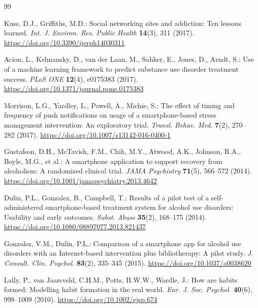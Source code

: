 \documentclass[a4paper]{article}
\begin{document}
\begin{thebibliography}{99}

 Kuss, D.J., Griffiths, M.D.: Social networking sites and addiction: Ten lessons learned. \textit{Int. J. Environ. Res. Public Health} \textbf{14}(3), 311 (2017). \url{https://doi.org/10.3390/ijerph14030311}

 Acion, L., Kelmansky, D., van der Laan, M., Sahker, E., Jones, D., Arndt, S.: Use of a machine learning framework to predict substance use disorder treatment success. \textit{PLoS ONE} \textbf{12}(4), e0175383 (2017). \url{https://doi.org/10.1371/journal.pone.0175383}

 Morrison, L.G., Yardley, L., Powell, A., Michie, S.: The effect of timing and frequency of push notifications on usage of a smartphone-based stress management intervention: An exploratory trial. \textit{Transl. Behav. Med.} \textbf{7}(2), 270--282 (2017). \url{https://doi.org/10.1007/s13142-016-0400-1}

 Gustafson, D.H., McTavish, F.M., Chih, M.Y., Atwood, A.K., Johnson, R.A., Boyle, M.G., et al.: A smartphone application to support recovery from alcoholism: A randomized clinical trial. \textit{JAMA Psychiatry} \textbf{71}(5), 566--572 (2014). \url{https://doi.org/10.1001/jamapsychiatry.2013.4642}

 Dulin, P.L., Gonzalez, B., Campbell, T.: Results of a pilot test of a self-administered smartphone-based treatment system for alcohol use disorders: Usability and early outcomes. \textit{Subst. Abuse} \textbf{35}(2), 168--175 (2014). \url{https://doi.org/10.1080/08897077.2013.821437}

 Gonzalez, V.M., Dulin, P.L.: Comparison of a smartphone app for alcohol use disorders with an Internet-based intervention plus bibliotherapy: A pilot study. \textit{J. Consult. Clin. Psychol.} \textbf{83}(2), 335--345 (2015). \url{https://doi.org/10.1037/a0038620}

 Lally, P., van Jaarsveld, C.H.M., Potts, H.W.W., Wardle, J.: How are habits formed: Modelling habit formation in the real world. \textit{Eur. J. Soc. Psychol.} \textbf{40}(6), 998--1009 (2010). \url{https://doi.org/10.1002/ejsp.674}

\end{thebibliography}
\end{document}
